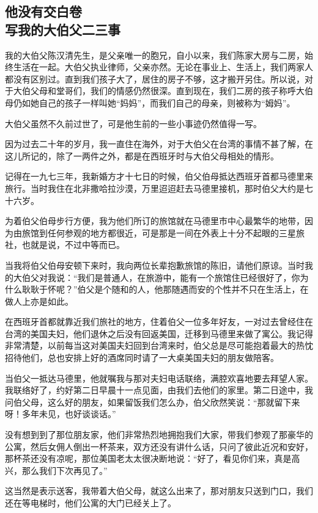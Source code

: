 \subsection{他没有交白卷\\\small{写我的大伯父二三事}}


\par 我的大伯父陈汉清先生，是父亲唯一的胞兄，自小以来，我们陈家大房与二房，始终生活在一起。大伯父执业律师，父亲亦然。无论在事业上、生活上，我们两家人都没有区别过。直到我们孩子大了，居住的房子不够，这才搬开另住。所以说，对于大伯父母和堂哥们，我们的情感仍然很深。直到现在，我们二房的孩子称呼大伯母仍如她自己的孩子一样叫她“妈妈”，而我们自己的母亲，则被称为“姆妈”。
\par 大伯父虽然不久前过世了，可是他生前的一些小事迹仍然值得一写。
\par 因为过去二十年的岁月，我一直住在海外，对于大伯父在台湾的事情不甚了解，在这儿所记的，除了一两件之外，都是在西班牙时与大伯父母相处的情形。
\par 记得在一九七三年，我新婚方才十七日的时候，伯父伯母抵达西班牙首都马德里来旅行。当时我住在北非撒哈拉沙漠，万里迢迢赶去马德里接机，那时伯父大约是七十六岁。
\par 为着伯父伯母步行方便，我为他们所订的旅馆就在马德里市中心最繁华的地带，因为由旅馆到任何参观的地方都很近，可是那是一间在外表上十分不起眼的三星旅社，也就是说，不过中等而已。
\par 当我将伯父伯母安顿下来时，我向两位长辈抱歉旅馆的陈旧，请他们原谅。当时我的大伯父对我说：“我们是普通人，在旅游中，能有一个旅馆住已经很好了，你为什么耿耿于怀呢？”伯父是个随和的人，他那随遇而安的个性并不只在生活上，在做人上亦是如此。
\par 在西班牙首都就靠近我们旅社的地方，住着伯父一位多年好友，一对过去曾经住在台湾的美国夫妇，他们退休之后没有回返美国，迁移到马德里来做了寓公。我记得非常清楚，以前每当这对美国夫妇回到台湾来时，伯父总是尽可能抱着最大的热忱招待他们，总也安排上好的酒席同时请了一大桌美国夫妇的朋友做陪客。
\par 当伯父一抵达马德里，他就嘱我与那对夫妇电话联络，满腔欢喜地要去拜望人家。我联络好了，约好第二日早晨十一点见面，由我们去他们的家里。第二日途中，我问伯父母，这么好的朋友，如果留饭我们怎么办，伯父欣然笑说：“那就留下来呀！多年未见，也好谈谈话。”
\par 没有想到到了那位朋友家，他们非常热烈地拥抱我们大家，带我们参观了那豪华的公寓，然后女佣人倒出一杯茶来，双方还没有讲什么话，只问了彼此近况和安好，那杯茶还没有凉呢，那位美国老太太很决断地说：“好了，看见你们来，真是高兴，那么我们下次再见了。”
\par 这当然是表示送客，我带着大伯父母，就这么出来了，那对朋友只送到门口，我们还在等电梯时，他们公寓的大门已经关上了。
